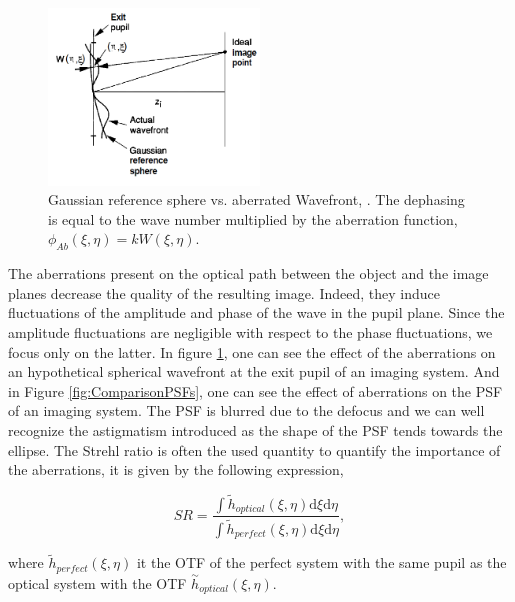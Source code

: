 \begin{minipage}{\linewidth}
\begin{figure}
\centering
\includegraphics[width=0.5\textwidth]{Figures/AbWFvsGausSphWF}
\decoRulewrapFig
\caption[Gaussian reference sphere vs. aberrated Wavefront]{Gaussian reference sphere vs. aberrated Wavefront, \citep[Chapter 6.4]{goodman_1968}. The dephasing is equal to the wave number multiplied by the aberration function, $\phi_{Ab}(\xi,\eta) = k W(\xi,\eta)$.}
\label{fig:AbWFvsGausSphWF}
\end{figure}

The aberrations present on the optical path between the object and the image planes decrease the quality of the resulting image. Indeed, they induce fluctuations of the amplitude and phase of the wave in the pupil plane. Since the amplitude fluctuations are negligible with respect to the phase fluctuations, we focus only on the latter. In figure \ref{fig:AbWFvsGausSphWF}, one can see the effect of the aberrations on an hypothetical spherical wavefront at the exit pupil of an imaging system. And in Figure \ref{fig:ComparisonPSFs}, one can see the effect of aberrations on the PSF of an imaging system. The PSF is blurred due to the defocus and we can well recognize the astigmatism introduced as the shape of the PSF tends towards the ellipse. The Strehl ratio is often the used quantity to quantify the importance of the aberrations, it is given by the following expression,

\begin{equation}
SR = \frac{\int \widetilde{h}_{optical}(\xi,\eta)\mathrm{d}\xi \mathrm{d}\eta}{\int \widetilde{h}_{perfect}(\xi,\eta) \mathrm{d}\xi \mathrm{d}\eta},
\label{eqt:StrehlRatio}
\end{equation}

where $\widetilde{h}_{perfect}(\xi,\eta)$ it the OTF of the perfect system with the same pupil as the optical system with the OTF $\overset{\sim}{h}_{optical}(\xi,\eta)$.
\end{minipage}

